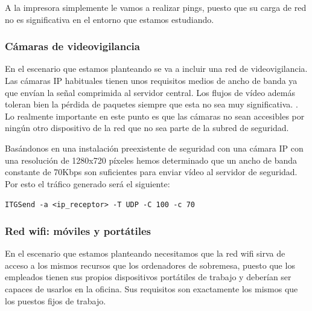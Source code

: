 A la impresora simplemente le vamos a realizar pings, puesto que su carga de red no es significativa en el entorno que estamos estudiando.

\subsubsection{Cámaras de videovigilancia}
En el escenario que estamos planteando se va a incluir una red de videovigilancia. Las cámaras IP habituales tienen unos requisitos medios de ancho de banda ya que envían la señal comprimida al servidor central. Los flujos de vídeo además toleran bien la pérdida de paquetes siempre que esta no sea muy significativa. \cite{boulos:hal-00354947}. Lo realmente importante en este punto es que las cámaras no sean accesibles por ningún otro dispositivo de la red que no sea parte de la subred de seguridad.

Basándonos en una instalación preexistente de seguridad con una cámara IP con una resolución de 1280x720 píxeles hemos determinado que un ancho de banda constante de 70Kbps son suficientes para enviar vídeo al servidor de seguridad. Por esto el tráfico generado será el siguiente:

\lstinline{ITGSend -a <ip_receptor> -T UDP -C 100 -c 70}

\subsubsection{Red wifi: móviles y portátiles}

En el escenario que estamos planteando necesitamos que la red wifi sirva de acceso a los mismos recursos que los ordenadores de sobremesa, puesto que los empleados tienen sus propios dispositivos portátiles de trabajo y deberían ser capaces de usarlos en la oficina. Sus requisitos son exactamente los mismos que los puestos fijos de trabajo.